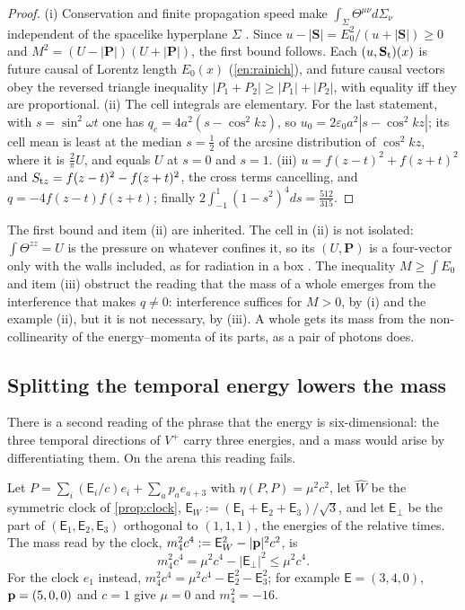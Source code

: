 \begin{proof}
(i) Conservation and finite propagation speed make $\int_\Sigma\Theta^{\mu\nu}d\Sigma_\nu$ independent of the spacelike hyperplane $\Sigma$
\cite{Laue1911}. Since $u-|\mathbf S|=E_0^2/(u+|\mathbf S|)\ge0$ and $M^2=(U-|\mathbf P|)(U+|\mathbf P|)$, the first bound follows. Each $(u,\mathbf S_{\rm t})(x)$ is
future causal of Lorentz length $E_0(x)$ (\cref{en:rainich}), and future causal vectors obey the reversed triangle inequality
$|P_1+P_2|\ge|P_1|+|P_2|$, with equality iff they are proportional. (ii) The cell integrals are elementary. For the last statement, with
$s=\sin^2\omega t$ one has $q_c=4a^2(s-\cos^2kz)$, so $u_0=2\varepsilon_0a^2|s-\cos^2kz|$; its cell mean is least at the median $s=\tfrac12$ of the
arcsine distribution of $\cos^2kz$, where it is $\tfrac2\pi U$, and equals $U$ at $s=0$ and $s=1$. (iii) $u=f(z-t)^2+f(z+t)^2$ and $S_{{\rm t}z}=f(z-t)^2-f(z+t)^2$, the
cross terms cancelling, and $q=-4f(z-t)f(z+t)$; finally $2\int_{-1}^1(1-s^2)^4ds=\tfrac{512}{315}$.
\end{proof}

The first bound and item (ii) are inherited. The cell in (ii) is not isolated: $\int\Theta^{zz}=U$ is the pressure on whatever confines it, so its
$(U,\mathbf P)$ is a four-vector only with the walls included, as for radiation in a box \cite{Laue1911}. The inequality $M\ge\int E_0$ and
item (iii) obstruct the reading that the mass of a whole emerges from the interference that makes $q\neq0$: interference suffices for $M>0$, by (i) and the example (ii),
but it is not necessary, by (iii). A whole gets its mass from the non-collinearity of the energy--momenta of its parts, as a pair of photons does.

\subsection{Splitting the temporal energy lowers the mass}
\label{sec:energy-temporal}

There is a second reading of the phrase that the energy is six-dimensional: the three temporal directions of $V^+$ carry three energies, and a
mass would arise by differentiating them. On the arena this reading fails.

\begin{proposition}
\label{en:temporal}
Let $P=\sum_i(\mathsf E_i/c)e_i+\sum_ap_ae_{a+3}$ with $\eta(P,P)=\mu^2c^2$, let $\widehat W$ be the symmetric clock of \cref{prop:clock},
$\mathsf E_W:=(\mathsf E_1+\mathsf E_2+\mathsf E_3)/\sqrt3$, and let $\mathsf E_\perp$ be the part of $(\mathsf E_1,\mathsf E_2,\mathsf E_3)$ orthogonal
to $(1,1,1)$, the energies of the relative times. The mass read by the clock, $m_4^2c^4:=\mathsf E_W^2-|\mathbf p|^2c^2$, is
\[
m_4^2c^4=\mu^2c^4-|\mathsf E_\perp|^2\le\mu^2c^4 .
\]
For the clock $e_1$ instead, $m_4^2c^4=\mu^2c^4-\mathsf E_2^2-\mathsf E_3^2$; for example $\mathsf E=(3,4,0)$, $\mathbf p=(5,0,0)$ and $c=1$ give $\mu=0$ and
$m_4^2=-16$.
\end{proposition}

